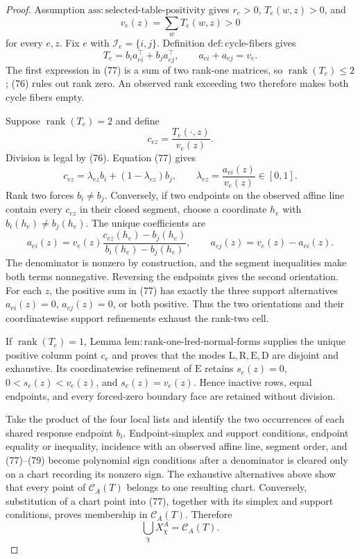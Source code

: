 \documentclass{article}
\begin{document}
\begin{proof}
Assumption \(\mathrm{ass{:}selected\text{-}table\text{-}positivity}\) gives \(r_e>0\), \(T_e(w,z)>0\), and
\[
 v_e(z)=\sum_wT_e(w,z)>0                                  \tag{76}
\]
for every \(e,z\).  Fix \(e\) with \(\mathcal I_e=\{i,j\}\).  Definition \(\mathrm{def{:}cycle\text{-}fibers}\) gives
\[
 T_e=b_i a_{ei}^{\top}+b_j a_{ej}^{\top},
 \qquad
 a_{ei}+a_{ej}=v_e.                                       \tag{77}
\]
The first expression in (77) is a sum of two rank-one matrices, so \(\operatorname{rank}(T_e)\le2\); (76) rules out rank zero.  An observed rank exceeding two therefore makes both cycle fibers empty.

Suppose \(\operatorname{rank}(T_e)=2\) and define
\[
 c_{ez}=\frac{T_e(\cdot,z)}{v_e(z)}.
\]
Division is legal by (76).  Equation (77) gives
\[
 c_{ez}=\lambda_{ez}b_i+(1-\lambda_{ez})b_j,
 \qquad
 \lambda_{ez}=\frac{a_{ei}(z)}{v_e(z)}\in[0,1].           \tag{78}
\]
Rank two forces \(b_i\ne b_j\).  Conversely, if two endpoints on the observed affine line contain every \(c_{ez}\) in their closed segment, choose a coordinate \(h_e\) with \(b_i(h_e)\ne b_j(h_e)\).  The unique coefficients are
\[
 a_{ei}(z)=v_e(z)
 \frac{c_{ez}(h_e)-b_j(h_e)}{b_i(h_e)-b_j(h_e)},
 \qquad
 a_{ej}(z)=v_e(z)-a_{ei}(z).                              \tag{79}
\]
The denominator is nonzero by construction, and the segment inequalities make both terms nonnegative.  Reversing the endpoints gives the second orientation.  For each \(z\), the positive sum in (77) has exactly the three support alternatives \(a_{ei}(z)=0\), \(a_{ej}(z)=0\), or both positive.  Thus the two orientations and their coordinatewise support refinements exhaust the rank-two cell.

If \(\operatorname{rank}(T_e)=1\), Lemma \(\mathrm{lem{:}rank\text{-}one\text{-}lred\text{-}normal\text{-}forms}\) supplies the unique positive column point \(c_e\) and proves that the modes \(\mathrm L,\mathrm R,\mathrm E,\mathrm D\) are disjoint and exhaustive.  Its coordinatewise refinement of \(\mathrm E\) retains \(s_e(z)=0\), \(0<s_e(z)<v_e(z)\), and \(s_e(z)=v_e(z)\).  Hence inactive rows, equal endpoints, and every forced-zero boundary face are retained without division.

Take the product of the four local lists and identify the two occurrences of each shared response endpoint \(b_i\).  Endpoint-simplex and support conditions, endpoint equality or inequality, incidence with an observed affine line, segment order, and (77)--(79) become polynomial sign conditions after a denominator is cleared only on a chart recording its nonzero sign.  The exhaustive alternatives above show that every point of \(\mathcal C_A(T)\) belongs to one resulting chart.  Conversely, substitution of a chart point into (77), together with its simplex and support conditions, proves membership in \(\mathcal C_A(T)\).  Therefore
\[
 \bigcup_{\chi}X^A_{\chi}=\mathcal C_A(T).               \tag{80}
\]


\end{proof}
\end{document}
